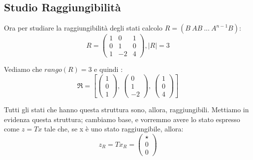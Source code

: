 \documentclass{article}
\begin{document}
\subsection{Studio Raggiungibilità}
Ora per studiare la raggiungibilità degli stati calcolo $R = (B\ AB\ ...\ A^{n-1}B)$: \[ R = \left(\begin{matrix}1 & 0 & 1\\0 & 1 & 0\\1 & -2 & 4\end{matrix}\right), |R| = 3 \] 

Vediamo che $rango(R) = 3$ e quindi : \[ \mathfrak{R} = \left[ \left(\begin{matrix}1\\0\\1\end{matrix}\right), \  \left(\begin{matrix}0\\1\\-2\end{matrix}\right), \  \left(\begin{matrix}1\\0\\4\end{matrix}\right)\right] \]

Tutti gli stati che hanno questa struttura sono, allora, raggiungibili. Mettiamo in evidenza questa struttura;
cambiamo base, e vorremmo avere lo stato espresso come $z = Tx$ tale che, se x è uno stato raggiungibile, allora: \[ z_R = T x_R = \begin{pmatrix} \star  \\ 0 \\0\end{pmatrix}\]
\end{document}
